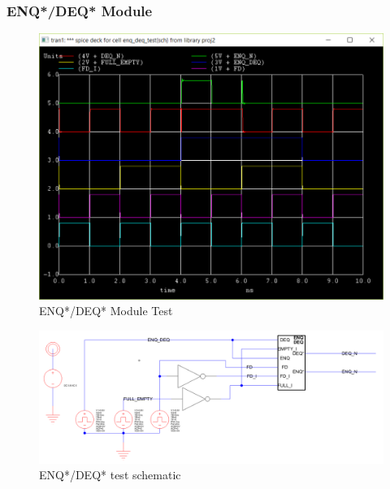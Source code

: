 \documentclass[12pt]{report}
\begin{document}
\subsubsection*{ENQ*/DEQ* Module}
\begin{figure}[H]
  \centering
    \includegraphics[width=1.0\textwidth]{enq_deq_test.PNG}
  \caption{ENQ*/DEQ* Module Test}
  \label{fig:enq_deq_test}
\end{figure}
\begin{figure}[H]
  \centering
    \includegraphics[width=1.0\textwidth]{TestSchematics/enq_deq.PNG}
  \caption{ENQ*/DEQ* test schematic}
\end{figure}
\end{document}
